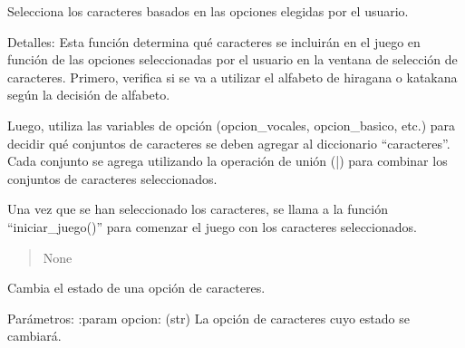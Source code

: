 \documentclass[letterpaper,10pt,spanish]{sphinxmanual}
\begin{document}
\begin{fulllineitems}

\begin{fulllineitems}
\label{\detokenize{menu_juego:menu_juego.CaracteresSelector.seleccionar_caracteres}}
\pysigstartsignatures
{}
\pysigstopsignatures
\sphinxAtStartPar
Selecciona los caracteres basados en las opciones elegidas por el usuario.

\sphinxAtStartPar
Detalles: Esta función determina qué caracteres se incluirán en el juego en función de las opciones
seleccionadas por el usuario en la ventana de selección de caracteres. Primero, verifica si se va a utilizar
el alfabeto de hiragana o katakana según la decisión de alfabeto.

\sphinxAtStartPar
Luego, utiliza las variables de opción (opcion\_vocales, opcion\_basico, etc.) para decidir qué conjuntos de
caracteres se deben agregar al diccionario “caracteres”. Cada conjunto se agrega utilizando la operación de
unión (|) para combinar los conjuntos de caracteres seleccionados.

\sphinxAtStartPar
Una vez que se han seleccionado los caracteres, se llama a la función “iniciar\_juego()” para comenzar el
juego con los caracteres seleccionados.
\begin{quote}\begin{description}
\sphinxAtStartPar
None

\end{description}\end{quote}

\end{fulllineitems}


\begin{fulllineitems}
\label{\detokenize{menu_juego:menu_juego.CaracteresSelector.toggle_opcion}}
\pysigstartsignatures
{}
\pysigstopsignatures
\sphinxAtStartPar
Cambia el estado de una opción de caracteres.

\sphinxAtStartPar
Parámetros:
:param opcion: (str) La opción de caracteres cuyo estado se cambiará.


\end{fulllineitems}
\end{fulllineitems}
\end{document}
